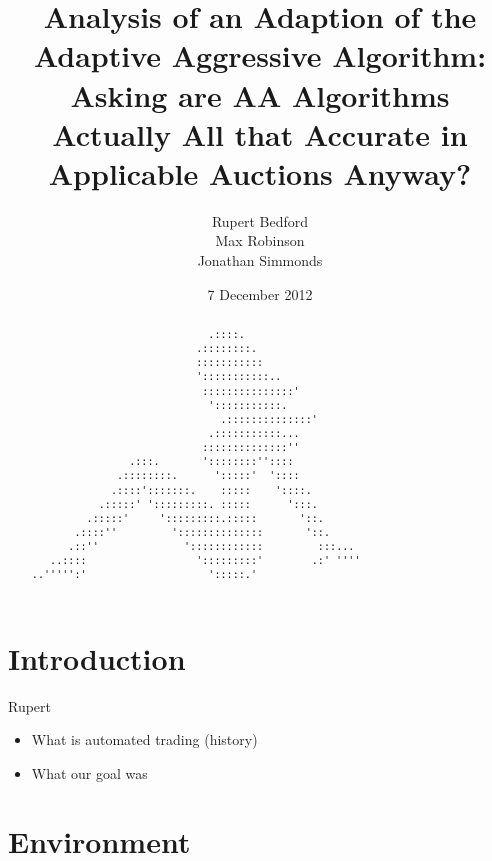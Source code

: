 \documentclass{acm_proc_article-sp}
\begin{document}
\title{Analysis of an Adaption of the Adaptive Aggressive Algorithm: Asking are AA Algorithms Actually All that Accurate in Applicable Auctions Anyway?}
\author{
  \alignauthor
    Rupert Bedford\\
  \alignauthor
    Max Robinson\\
  \alignauthor
    Jonathan Simmonds
}
\date{7 December 2012}

\maketitle
\begin{abstract} \label{sec:abstract}
\begin{verbatim}
                             .::::. 
                           .::::::::. 
                           ::::::::::: 
                           ':::::::::::.. 
                            :::::::::::::::' 
                             ':::::::::::. 
                               .::::::::::::::' 
                             .:::::::::::... 
                            ::::::::::::::'' 
                .:::.       '::::::::'':::: 
              .::::::::.      ':::::'  ':::: 
             .::::':::::::.    :::::    '::::. 
           .:::::' ':::::::::. :::::      ':::. 
         .:::::'     ':::::::::.:::::       '::. 
       .::::''         '::::::::::::::       '::. 
      .::''              '::::::::::::         :::... 
   ..::::                  ':::::::::'        .:' '''' 
..''''':'                    ':::::.' 
\end{verbatim}
\end{abstract}

\pagebreak

\section{Introduction} \label{sec:introduction}
Rupert

\begin{itemize}
	\item What is automated trading (history)
	\item What our goal was
\end{itemize}


\section{Environment} \label{sec:environment}
\end{document}
